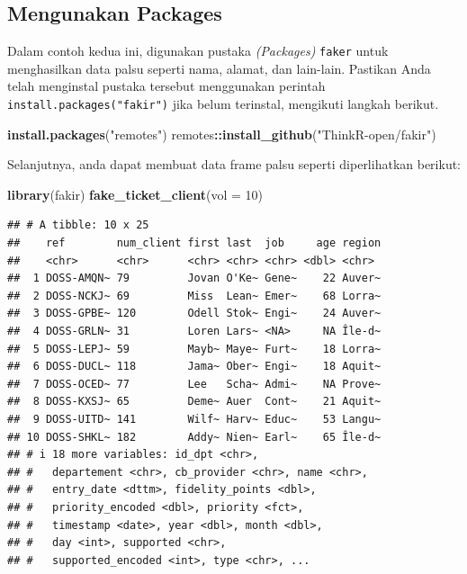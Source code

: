 \documentclass[
]{book}
\newenvironment{Shaded}{\begin{snugshade}}{\end{snugshade}}
\newcommand{\AttributeTok}[1]{\textcolor[rgb]{0.13,0.29,0.53}{#1}}
\newcommand{\DecValTok}[1]{\textcolor[rgb]{0.00,0.00,0.81}{#1}}
\newcommand{\FunctionTok}[1]{\textcolor[rgb]{0.13,0.29,0.53}{\textbf{#1}}}
\newcommand{\NormalTok}[1]{#1}
\newcommand{\SpecialCharTok}[1]{\textcolor[rgb]{0.81,0.36,0.00}{\textbf{#1}}}
\newcommand{\StringTok}[1]{\textcolor[rgb]{0.31,0.60,0.02}{#1}}
\begin{document}
\hypertarget{mengunakan-packages}{%
\subsection{Mengunakan Packages}\label{mengunakan-packages}}

Dalam contoh kedua ini, digunakan pustaka \emph{(Packages)} \texttt{faker} untuk menghasilkan data palsu seperti nama, alamat, dan lain-lain. Pastikan Anda telah menginstal pustaka tersebut menggunakan perintah \texttt{install.packages("fakir")} jika belum terinstal, mengikuti langkah berikut.

\begin{Shaded}
\begin{Highlighting}[]
\FunctionTok{install.packages}\NormalTok{(}\StringTok{"remotes"}\NormalTok{)}
\NormalTok{remotes}\SpecialCharTok{::}\FunctionTok{install\_github}\NormalTok{(}\StringTok{"ThinkR{-}open/fakir"}\NormalTok{)}
\end{Highlighting}
\end{Shaded}

Selanjutnya, anda dapat membuat data frame palsu seperti diperlihatkan berikut:

\begin{Shaded}
\begin{Highlighting}[]
\FunctionTok{library}\NormalTok{(fakir)}
\FunctionTok{fake\_ticket\_client}\NormalTok{(}\AttributeTok{vol =} \DecValTok{10}\NormalTok{)}
\end{Highlighting}
\end{Shaded}

\begin{verbatim}
## # A tibble: 10 x 25
##    ref        num_client first last  job     age region
##    <chr>      <chr>      <chr> <chr> <chr> <dbl> <chr> 
##  1 DOSS-AMQN~ 79         Jovan O'Ke~ Gene~    22 Auver~
##  2 DOSS-NCKJ~ 69         Miss  Lean~ Emer~    68 Lorra~
##  3 DOSS-GPBE~ 120        Odell Stok~ Engi~    24 Auver~
##  4 DOSS-GRLN~ 31         Loren Lars~ <NA>     NA Île-d~
##  5 DOSS-LEPJ~ 59         Mayb~ Maye~ Furt~    18 Lorra~
##  6 DOSS-DUCL~ 118        Jama~ Ober~ Engi~    18 Aquit~
##  7 DOSS-OCED~ 77         Lee   Scha~ Admi~    NA Prove~
##  8 DOSS-KXSJ~ 65         Deme~ Auer  Cont~    21 Aquit~
##  9 DOSS-UITD~ 141        Wilf~ Harv~ Educ~    53 Langu~
## 10 DOSS-SHKL~ 182        Addy~ Nien~ Earl~    65 Île-d~
## # i 18 more variables: id_dpt <chr>,
## #   departement <chr>, cb_provider <chr>, name <chr>,
## #   entry_date <dttm>, fidelity_points <dbl>,
## #   priority_encoded <dbl>, priority <fct>,
## #   timestamp <date>, year <dbl>, month <dbl>,
## #   day <int>, supported <chr>,
## #   supported_encoded <int>, type <chr>, ...
\end{verbatim}
\end{document}

